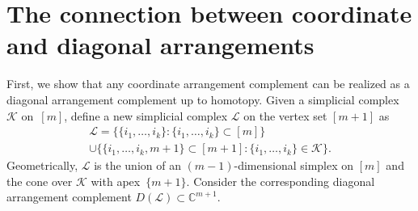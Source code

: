 \documentclass[a4paper,12pt]{amsart}
\newcommand{\K}{\mathcal K}
\newcommand{\CC}{\mathbb C}
\theoremstyle{definition}
\theoremstyle{remark}
\numberwithin{equation}{section}
\begin{document}
\section{The connection between coordinate and diagonal arrangements}
First, we show that any coordinate arrangement complement can be realized as a diagonal arrangement complement up to homotopy.
Given a simplicial complex $\mathcal K$ on~$[m]$, define a new simplicial complex $\mathcal{L}$ on the vertex set $[m+1]$ as
	\begin{multline}\label{from-d-to-u}
		\mathcal{L} = \bigl\{ { \{i_1, \dots, i_k \}: \{i_1, \dots, i_k \} \subset [m] }\bigr\} \\
		\cup \bigl\{ { \{i_1, \dots, i_k, m+1\} \subset [m+1]: \{ i_1, \dots, i_k \} \in \K }\bigr\} .
	\end{multline}
 Geometrically, $\mathcal{L}$ is the union of an $(m-1)$-dimensional simplex on $[m]$ and the cone over $\K$ with apex~$\{m+1\}$.
Consider the corresponding diagonal arrangement complement $D(\mathcal{L}) \subset \CC^{m+1}$. 
\end{document}
